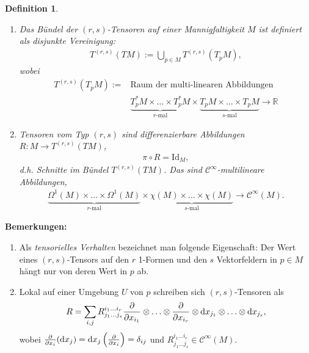 \documentclass[12pt,a4paper]{article}
\def\R{\mathbb{R}}
\def\Id{\mathrm{Id}}
\newtheorem{Definition}[Lemma]{Definition}
\begin{document}
\begin{Definition}
\begin{enumerate}
  \item Das \emph{B\"undel der $(r,s)$-Tensoren} auf einer Mannigfaltigkeit $M$
  ist definiert als disjunkte Vereinigung:
  \begin{align*}
  T^{(r,s)}(TM) := \bigcup_{p\in M} T^{(r,s)}(T_pM),
  \end{align*}
  wobei
  \begin{align*}
  T^{(r,s)}(T_pM) := &\text{Raum der multi-linearen Abbildungen}\\
  & \underbrace{T_p^*M \times \ldots \times T_p^*M}_{r\text{-mal}} \times
  \underbrace{T_pM\times \ldots \times T_pM}_{s\text{-mal}}
  \to
  \R
  \end{align*}
  \item \emph{Tensoren vom Typ $(r,s)$} sind differenzierbare Abbildungen $R:
  M\to T^{(r,s)}(TM)$,
  \begin{align*}
  \pi\circ R = \Id_M,
  \end{align*}
  d.h. Schnitte im B\"undel $T^{(r,s)}(TM)$. Das sind $\mathcal
  C^\infty$-multilineare Abbildungen,
  \begin{align*}
  \underbrace{\Omega^1(M)\times\ldots\times \Omega^1(M)}_{r\text{-mal}} \times
  \underbrace{\chi(M)\times \ldots \times \chi(M)}_{s\text{-mal}}\to \mathcal
  C^\infty(M).
  \end{align*}
\end{enumerate}
\end{Definition}

\bigskip

{\bf Bemerkungen:}

\begin{enumerate}
  \item Als \emph{tensorielles Verhalten} bezeichnet man folgende Eigenschaft:
  Der Wert eines $(r,s)$-Tensors auf den $r$ 1-Formen und den $s$ Vektorfeldern
  in $p\in M$ h\"angt nur von deren Wert in $p$ ab.
  \item Lokal auf einer Umgebung $U$ von $p$ schreiben sich $(r,s)$-Tensoren als
  \begin{align*}
  R = \sum_{i,j} R_{j_1\ldots j_s}^{i_1\ldots i_r} \frac{\partial}{\partial
  x_{i_1}}\otimes\ldots\otimes\frac{\partial}{\partial
  x_{i_r}}\otimes \mathrm{d}x_{j_1}\otimes\ldots\otimes \mathrm{d}x_{j_s},
  \end{align*}
  wobei $\frac{\partial}{\partial x_i}(\mathrm{d}x_j) =
  \mathrm{d}x_j\left(\frac{\partial}{\partial x_i}\right) = \delta_{ij}$ und
  $R_{j_1\ldots j_s}^{i_1\ldots i_r}\in \mathcal C^\infty(M)$.
\end{enumerate}
\end{document}
